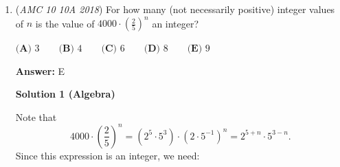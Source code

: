 \begin{enumerate}
Let $x$ be the amount of votes cast, $35\%$ of $x$ would be dislikes and $65\%$ of $x$ would be likes. Since a like earns the video 1 point and a dislike takes 1 point away from the video, the amount of points Sangho's video will have in terms of $x$ is $65\%-35\%=30\%$ of $x$, or $\frac{3}{10}$ of $x$. Because Songho's video had a score of 90 points, $\frac{3x}{10} = 90$. After we solve for $x$, we get $x = \boxed{\textbf{(B) } 300}$.

 -Mathandski

 



\textbf{Solution 4}

Let x be the amount of like votes and y be the amount of dislike votes. Then $x-y=90$. Since $65\%$ of the total votes are like votes,$0.65(x+y)=x$. then $.65y = .35x$ or $13/7$y = $x$. Plugging that in to the original equation, $6/7 y$ = $90$ and $y =105$Then $x=195$ and the total number of votes is $105+195 = 300$. The answer is $\boxed{\textbf{(B) } 300}$.

 -goldenn

 



\textbf{Solution 5}

Obviously, $90/(65\%-35\%) = 90/30\% = 300$. The answer is $\boxed{\textbf{(B) } 300}$.

 (Note from <B+: please explain why this solution starts with the word "obviously." May the author or some other editor explain the "obviously" preceding the fraction which is the answer.)

 Education, the Study of Everything

 


 


	\item (\textit{AMC 10 10A 2018}) For how many (not necessarily positive) integer values of $n$ is the value of $4000\cdot \left(\frac{2}{5}\right)^n$ an integer?


 $\textbf{(A) }3 \qquad \textbf{(B) }4 \qquad \textbf{(C) }6 \qquad \textbf{(D) }8 \qquad \textbf{(E) }9 \qquad$

 \textbf{Answer: }E



\textbf{Solution 1 (Algebra)}

Note that 
 \[4000\cdot \left(\frac{2}{5}\right)^n=\left(2^5\cdot5^3\right)\cdot \left(2\cdot5^{-1}\right)^n=2^{5+n}\cdot5^{3-n}.\]Since this expression is an integer, we need: 


\end{enumerate}
